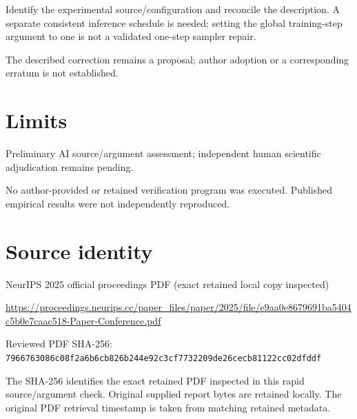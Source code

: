 \documentclass[11pt]{article}
\begin{document}
Identify the experimental source/configuration and reconcile the description. A separate consistent inference schedule is needed; setting the global training-step argument to one is not a validated one-step sampler repair.

The described correction remains a proposal; author adoption or a corresponding erratum is not established.

\section*{Limits}

Preliminary AI source/argument assessment; independent human scientific adjudication remains pending.\par

No author-provided or retained verification program was executed. Published empirical results were not independently reproduced.\par

\section*{Source identity}

NeurIPS 2025 official proceedings PDF (exact retained local copy inspected)

\url{https://proceedings.neurips.cc/paper_files/paper/2025/file/e9aa0e8679691ba5404c5b0e7caac518-Paper-Conference.pdf}

Reviewed PDF SHA-256: \nolinkurl{7966763086c08f2a6b6cb826b244e92c3cf7732209de26cecb81122cc02dfddf}

The SHA-256 identifies the exact retained PDF inspected in this rapid source/argument check. Original supplied report bytes are retained locally. The original PDF retrieval timestamp is taken from matching retained metadata.
\end{document}
